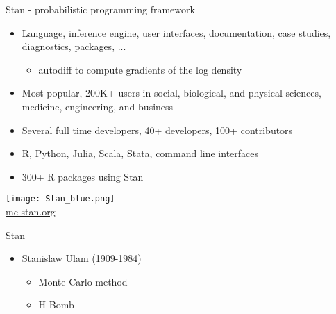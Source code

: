 \documentclass[finnish,english,t]{beamer}
\begin{document}
\begin{frame}{Stan - probabilistic programming framework}

   \begin{itemize}
   \item Language, inference engine, user interfaces, documentation,
     case studies, diagnostics, packages, ...
     \begin{itemize}
     \item autodiff to compute gradients of the log density
     \end{itemize}
   \item<2-> Most popular, 200K+ users in social, biological, and
     physical sciences, medicine, engineering, and business
     
   \item<3-> Several full time developers, 40+ developers, 100+ contributors
   \item<4-> R, Python, Julia, Scala, Stata, command line interfaces
    \item<4-> 300+ R packages using Stan
   \end{itemize}
  \vfill
  \begin{center}
    \texttt{[image: Stan\_blue.png]}\\
    \url{mc-stan.org}
  \end{center}
\end{frame}

\begin{frame}{Stan}

  \begin{itemize}
  \item Stanislaw Ulam (1909-1984)
    \begin{itemize}
    \item Monte Carlo method
    \item H-Bomb
    \end{itemize}
  \end{itemize}
  
\end{frame}
\end{document}
